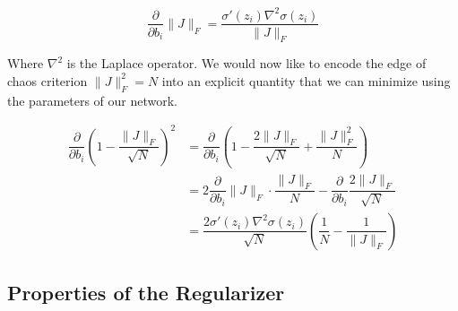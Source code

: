 \begin{equation}
\dfrac{\partial}{\partial b_i}\|J\|_F = \dfrac{\sigma'(z_i) \nabla^2\sigma(z_i)}{\|J\|_F}
\end{equation}

Where $\nabla^2$ is the Laplace operator. We would now like to encode the edge of chaos criterion $\|J\|_F^2=N$ into an explicit quantity that we can minimize using the parameters of our network.

\begin{align}
\dfrac{\partial}{\partial b_i} \left(1-\dfrac{\|J\|_F}{\sqrt{N}}\right)^2 &=  \dfrac{\partial}{\partial b_i}\left(1-\dfrac{2\|J\|_F}{\sqrt{N}}+\dfrac{\|J\|_F^2}{N}\right)\\
&= 2\dfrac{\partial}{\partial b_i}\|J\|_F\cdot\dfrac{\|J\|_F}{N} - \dfrac{\partial}{\partial b_i} \dfrac{2\|J\|_F}{\sqrt{N}}\\
&= \dfrac{2 \sigma'(z_i)\nabla^2 \sigma(z_i)}{\sqrt{N}}\left(\dfrac{1}{N}-\dfrac{1}{\|J\|_F}\right)
\end{align}

\subsection{Properties of the Regularizer}